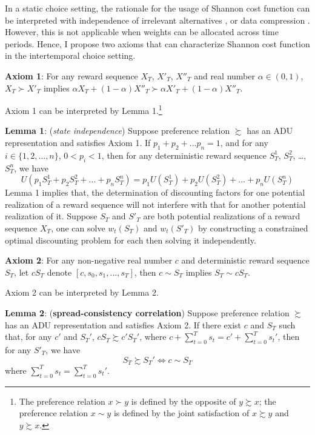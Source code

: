 \documentclass[
  12pt,
]{article}
\begin{document}
In a static choice setting, the rationale for the usage of Shannon cost
function can be interpreted with independence of irrelevant alternatives
\citep{matejka_rational_2015}, or data compression
\citep{caplin_rationally_2022}. However, this is not applicable when
weights can be allocated across time periods. Hence, I propose two
axioms that can characterize Shannon cost function in the intertemporal
choice setting.

\textbf{Axiom 1}: For any reward sequence \(X_T\), \(X'_T\), \(X''_T\)
and real number \(\alpha\in(0,1)\), \(X_T\succ X'_T\) implies
\(\alpha X_T+ (1-\alpha)X''_T \succ \alpha X'_T + (1-\alpha) X''_T\).

Axiom 1 can be interpreted by Lemma 1.\footnote{The preference relation
  \(x \succ y\) is defined by the opposite of \(y\succsim x\); the
  preference relation \(x\sim y\) is defined by the joint satisfaction
  of \(x\succsim y\) and \(y \succsim x\).}

\textbf{Lemma 1}: (\emph{state independence}) Suppose preference
relation \(\succsim\) has an ADU representation and satisfies Axiom 1.
If \(p_1+p_2+...p_n=1\), and for any \(i\in\{1,2,…,n\}\), \(0<p_i<1\),
then for any deterministic reward sequence \(S^1_T\), \(S^2_T\), \ldots,
\(S^n_T\), we have\[
U(p_1 S^1_T+p_2S^2_T+...+p_nS^n_T)=p_1U(S^1_T)+p_2U(S^2_T)+...+p_nU(S^n_T)
\]Lemma 1 implies that, the determination of discounting factors for one
potential realization of a reward sequence will not interfere with that
for another potential realization of it. Suppose \(S_T\) and \(S'_{T}\)
are both potential realizations of a reward sequence \(X_T\), one can
solve \(w_t(S_T)\) and \(w_t(S'_T)\) by constructing a constrained
optimal discounting problem for each then solving it independently.

\textbf{Axiom 2}: For any non-negative real number \(c\) and
deterministic reward sequence \(S_T\), let \(cS_T\) denote
\([c,s_0,s_1,...,s_T]\), then \(c\sim S_T\) implies \(S_T \sim cS_T\).

Axiom 2 can be interpreted by Lemma 2.

\textbf{Lemma 2}: (\textbf{spread-consistency correlation}) Suppose
preference relation \(\succsim\) has an ADU representation and satisfies
Axiom 2. If there exist \(c\) and \(S_T\) such that, for any \(c'\) and
\(S_T'\), \(cS_T\succsim c'S_T'\), where
\(c+\sum_{t=0}^Ts_t=c'+\sum_{t=0}^Ts_t'\), then for any \(S'_T\), we
have \[S_T \succsim S_T' \Longleftrightarrow c\sim S_T\]where
\(\sum_{t=0}^Ts_t=\sum_{t=0}^Ts_t'\).
\end{document}
